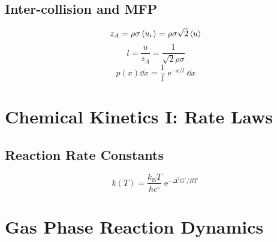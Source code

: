 \documentclass[a4paper]{article}
\DeclareMathOperator{\e}{\mathrm{e}}
\newcommand{\kB}{k_\mathrm{B}}
\numberwithin{equation}{section}
\begin{document}
\subsection{Inter-collision and MFP}
\begin{equation}\label{key}
z_A  = \rho \sigma \ev{u_r} = \rho\sigma \sqrt{2}\ev{u}
\end{equation}
\begin{equation}\label{key}
l = \dfrac{u}{z_A} = \dfrac{1}{\sqrt{2}\rho\sigma}
\end{equation}
\begin{equation}\label{key}
p(x)\dd x = \dfrac{1}{l}\e^{-x/l}\dd x
\end{equation}








\section{Chemical Kinetics I: Rate Laws}
\setcounter{subsection}{7}
\subsection{Reaction Rate Constants}
\begin{equation}\label{key}
k(T) = \dfrac{\kB T}{h c^\circ}\e^{-\Delta^\ddagger G^\circ/RT}
\end{equation}

\section{}


\section{Gas Phase Reaction Dynamics}
\end{document}
